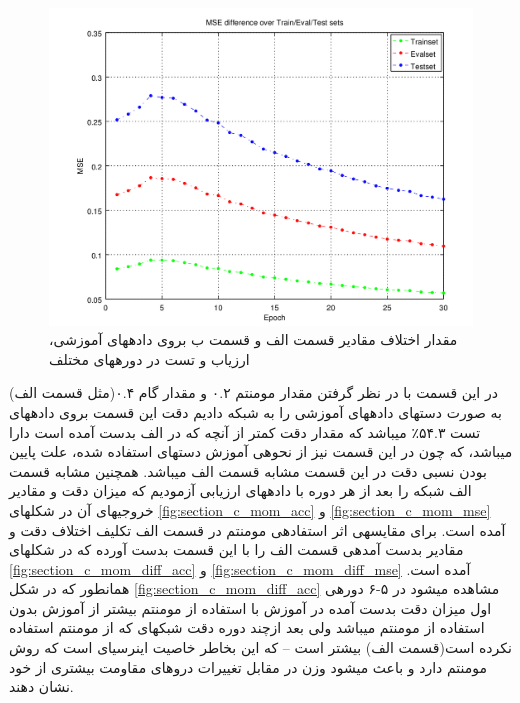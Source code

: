 \documentclass[10pt,a4paper]{article}
\newcommand{\نیمفاصله}{\halfspace}
\renewcommand{\ }{\halfspace}
\newcommand{\بپ}{انتشار-به-عقب }
\newcommand{\منست}{\lr{MNIST} }
\newcommand{\مسی}{\lr{MSE} }
\newcommand{\فوتنت}[1]{\footnote{\lr{#1}}}
\begin{document}
\begin{figure}[h!]
\centering
\includegraphics[width=.9\textwidth]{2_online_diff_mse}
\caption{مقدار اختلاف مقادیر \مسی قسمت الف و قسمت ب بروی داده\ های آموزشی، ارزیاب و تست در دوره\ های مختلف}\label{fig:section_b_online_diff_mse}
\end{figure}
در این قسمت با در نظر گرفتن مقدار مومنتم ۰.۲ و مقدار گام ۰.۴(مثل قسمت الف) به صورت دسته\ ای داده\ های آموزشی را به شبکه دادیم دقت این قسمت بروی داده\ های تست ۵۴.۳٪ می\ باشد که مقدار دقت کمتر از آنچه که در الف بدست آمده است دارا می\ باشد، که چون در این قسمت نیز از نحوه\ ی آموزش دسته\ ای استفاده شده، علت پایین بودن نسبی دقت در این قسمت مشابه قسمت الف می\ باشد. همچنین مشابه قسمت الف شبکه را بعد از هر دوره با داده\ های ارزیابی آزمودیم که میزان دقت و مقادیر \مسی خروجی\ های آن در شکل\ های
\ref{fig:section_c_mom_acc} و \ref{fig:section_c_mom_mse}
آمده است.
برای مقایسه\ ی اثر استفاده\ ی مومنتم در قسمت الف تکلیف اختلاف دقت و مقادیر \مسی بدست آمده\ ی قسمت الف را با این قسمت بدست آورده که در شکل\ های
\ref{fig:section_c_mom_diff_acc} و \ref{fig:section_c_mom_diff_mse}
آمده است. همان\ طور که در شکل
\ref{fig:section_c_mom_diff_acc}
مشاهده می\ شود در ۵-۶ دوره\ ی اول میزان دقت بدست آمده در آموزش با استفاده از مومنتم بیشتر از آموزش بدون استفاده از مومنتم می\ باشد ولی بعد ازچند دوره دقت شبکه\ ای که از مومنتم استفاده نکرده است(قسمت الف) بیشتر است -- که این بخاطر خاصیت اینرسی\ ای است که روش مومنتم دارد و باعث می\ شود وزن در مقابل تغییرات دروه\ ای مقاومت بیشتری از خود نشان دهند.
\newpage
\end{document}
